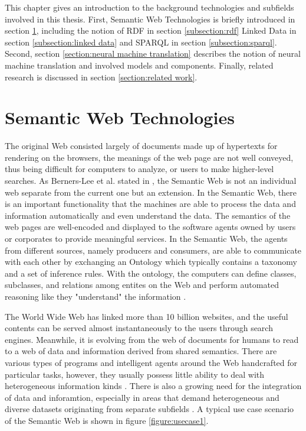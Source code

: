 
This chapter gives an introduction to the background technologies and subfields involved in this thesis. First, Semantic Web Technologies is briefly introduced in section \ref{section:semantic web technologies}, including the notion of RDF in section \ref{subsection:rdf} Linked Data in section \ref{subsection:linked data} and SPARQL in section \ref{subsection:sparql}. Second, section \ref{section:neural machine translation} describes the notion of neural machine translation and involved models and components. Finally, related research is discussed in section \ref{section:related work}.

\section{Semantic Web Technologies} \label{section:semantic web technologies}

The original Web consisted largely of documents made up of hypertexts for rendering on the browsers, the meanings of the web page are not well conveyed, thus being difficult for computers to analyze, or users to make higher-level searches. As Berners-Lee et al. stated in \cite{Berners-Lee2001}, the Semantic Web is not an individual web separate from the current one but an extension. In the Semantic Web, there is an important functionality that the machines are able to process the data and information automatically and even understand the data. The semantics of the web pages are well-encoded and displayed to the software agents owned by users or corporates to provide meaningful services. In the Semantic Web, the agents from different sources, namely producers and consumers, are able to communicate with each other by exchanging an Ontology which typically contains a taxonomy and a set of inference rules. With the ontology, the computers can define classes, subclasses, and relations among entites on the Web and perform automated reasoning like they "understand" the information \cite{Berners-Lee2001}.

The World Wide Web has linked more than 10 billion websites, and the useful contents can be served almost instantaneously to the users through search engines. Meanwhile, it is evolving from the web of documents for humans to read to a web of data and information derived from shared semantics. There are various types of programs and intelligent agents around the Web handcrafted for particular tasks, however, they usually possess little ability to deal with heterogeneous information kinds \cite{Shadbolt2006}. There is also a growing need for the integration of data and inforamtion, especially in areas that demand heterogeneous and diverse datasets originating from separate subfields \cite{Shadbolt2006}. A typical use case scenario of the Semantic Web is shown in figure \ref{figure:usecase1}.

